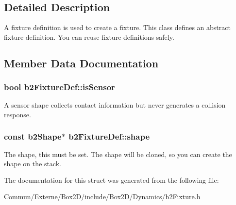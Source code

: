 \subsection{Detailed Description}
A fixture definition is used to create a fixture. This class defines an abstract fixture definition. You can reuse fixture definitions safely. 

\subsection{Member Data Documentation}
\subsubsection[{\texorpdfstring{is\+Sensor}{isSensor}}]{\setlength{\rightskip}{0pt plus 5cm}bool b2\+Fixture\+Def\+::is\+Sensor}\hypertarget{structb2_fixture_def_ac8cfcc6208663c92861eaab3b3fdc57e}{}\label{structb2_fixture_def_ac8cfcc6208663c92861eaab3b3fdc57e}
A sensor shape collects contact information but never generates a collision response. 
\subsubsection[{\texorpdfstring{shape}{shape}}]{\setlength{\rightskip}{0pt plus 5cm}const {\bf b2\+Shape}$\ast$ b2\+Fixture\+Def\+::shape}\hypertarget{structb2_fixture_def_a1e41753d89abf3443e7897e2498a3240}{}\label{structb2_fixture_def_a1e41753d89abf3443e7897e2498a3240}
The shape, this must be set. The shape will be cloned, so you can create the shape on the stack. 

The documentation for this struct was generated from the following file\+:\begin{DoxyCompactItemize}
\item 
Commun/\+Externe/\+Box2\+D/include/\+Box2\+D/\+Dynamics/b2\+Fixture.\+h\end{DoxyCompactItemize}
